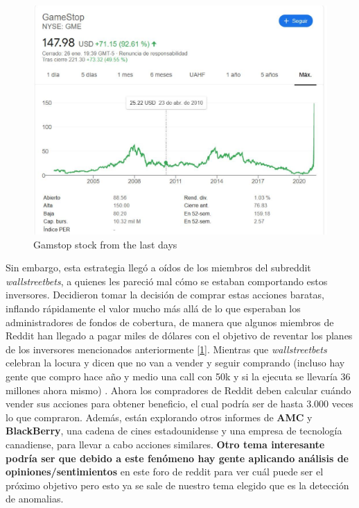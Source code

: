 \documentclass[12pt,twoside]{report}
\begin{document}
\begin{figure}[H]
\includegraphics[width=\textwidth]{../code/figures/gamestop-stocks}
\centering
\caption{Gamstop stock from the last days}
\label{fig:gamestop-stock}
\end{figure}

Sin embargo, esta estrategia llegó a oídos de los miembros del subreddit \textit{wallstreetbets}, a quienes les pareció mal cómo se estaban comportando estos inversores. Decidieron tomar la decisión de comprar estas acciones baratas, inflando rápidamente el valor mucho más allá de lo que esperaban los administradores de fondos de cobertura, de manera que algunos miembros de Reddit han llegado a pagar miles de dólares con el objetivo de reventar los planes de los inversores mencionados anteriormente [\ref{fig:gamestop-stock}]. Mientras que \textit{wallstreetbets} celebran la locura y dicen que no van a vender y seguir comprando (incluso hay gente que compro hace año y medio una call con 50k y si la ejecuta se llevaría 36 millones ahora mismo) \cite{call}. Ahora los compradores de Reddit deben calcular cuándo vender sus acciones para obtener beneficio, el cual podría ser de hasta 3.000 veces lo que compraron. Además, están explorando otros informes de \textbf{AMC} y \textbf{BlackBerry}, una cadena de cines estadounidense y una empresa de tecnología canadiense, para llevar a cabo acciones similares. \textbf{Otro tema interesante podría ser que debido a este fenómeno hay gente aplicando análisis de opiniones/sentimientos} en este foro de reddit para ver cuál puede ser el próximo objetivo pero esto ya se sale de nuestro tema elegido que es la detección de anomalias.
\end{document}
